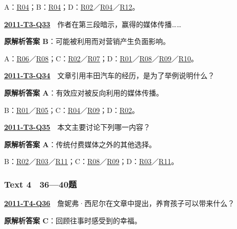 \documentclass[11pt,a4paper]{article}
\begin{document}
\noindent A：\hyperref[cat-R04]{R04}；B：\hyperref[cat-R04]{R04}；D：\hyperref[cat-R02]{R02}／\hyperref[cat-R04]{R04}／\hyperref[cat-R12]{R12}。\par\smallskip
{}\label{idx-2011-T3-Q33}\noindent\textbf{\href{https://zj139.github.io/math-notes/english/f805d4b3fde383fcf2cf2e5c/\#q33}{2011-T3-Q33}}　作者在第三段暗示，赢得的媒体传播……\par\nopagebreak
\noindent\textbf{原解析答案 B}：可能被利用而对营销产生负面影响。\par\nopagebreak
\noindent A：\hyperref[cat-R06]{R06}／\hyperref[cat-R08]{R08}；C：\hyperref[cat-R02]{R02}／\hyperref[cat-R07]{R07}；D：\hyperref[cat-R01]{R01}／\hyperref[cat-R08]{R08}／\hyperref[cat-R09]{R09}／\hyperref[cat-R10]{R10}。\par\smallskip
{}\label{idx-2011-T3-Q34}\noindent\textbf{\href{https://zj139.github.io/math-notes/english/f805d4b3fde383fcf2cf2e5c/\#q34}{2011-T3-Q34}}　文章引用丰田汽车的经历，是为了举例说明什么？\par\nopagebreak
\noindent\textbf{原解析答案 A}：有效应对被反向利用的媒体传播。\par\nopagebreak
\noindent B：\hyperref[cat-R01]{R01}／\hyperref[cat-R05]{R05}；C：\hyperref[cat-R04]{R04}／\hyperref[cat-R09]{R09}；D：\hyperref[cat-R02]{R02}。\par\smallskip
{}\label{idx-2011-T3-Q35}\noindent\textbf{\href{https://zj139.github.io/math-notes/english/f805d4b3fde383fcf2cf2e5c/\#q35}{2011-T3-Q35}}　本文主要讨论下列哪一内容？\par\nopagebreak
\noindent\textbf{原解析答案 A}：传统付费媒体之外的其他选择。\par\nopagebreak
\noindent B：\hyperref[cat-R02]{R02}／\hyperref[cat-R03]{R03}／\hyperref[cat-R11]{R11}；C：\hyperref[cat-R08]{R08}／\hyperref[cat-R09]{R09}；D：\hyperref[cat-R03]{R03}／\hyperref[cat-R11]{R11}。\par\smallskip
{}\subsubsection{Text 4　36—40题}
\label{idx-2011-T4-Q36}\noindent\textbf{\href{https://zj139.github.io/math-notes/english/e9415d068acb3ef20c371d2c/\#q36}{2011-T4-Q36}}　詹妮弗·西尼尔在文章中提出，养育孩子可以带来什么？\par\nopagebreak
\noindent\textbf{原解析答案 C}：回顾往事时感受到的幸福。\par\nopagebreak
\end{document}
